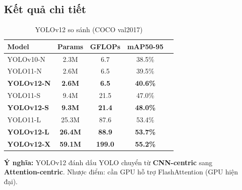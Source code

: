 \subsection{Kết quả chi tiết}
\begin{table}[H]\centering
\caption{YOLOv12 so sánh (COCO val2017)}
\begin{tabular}{lcccc}\toprule
\textbf{Model} & \textbf{Params} & \textbf{GFLOPs} & \textbf{mAP50-95}\\\midrule
YOLOv10-N & 2.3M & 6.7 & 38.5\% \\
YOLO11-N & 2.6M & 6.5 & 39.5\% \\
\textbf{YOLOv12-N} & \textbf{2.6M} & \textbf{6.5} & \textbf{40.6\%} \\
\midrule
YOLO11-S & 9.4M & 21.5 & 47.0\% \\
\textbf{YOLOv12-S} & \textbf{9.3M} & \textbf{21.4} & \textbf{48.0\%} \\
\midrule
YOLO11-L & 25.3M & 87.6 & 53.4\% \\
\textbf{YOLOv12-L} & \textbf{26.4M} & \textbf{88.9} & \textbf{53.7\%} \\
\midrule
\textbf{YOLOv12-X} & \textbf{59.1M} & \textbf{199.0} & \textbf{55.2\%} \\\bottomrule
\end{tabular}
\end{table}

\textbf{Ý nghĩa:} YOLOv12 đánh dấu YOLO chuyển từ \textbf{CNN-centric} sang \textbf{Attention-centric}. Nhược điểm: cần GPU hỗ trợ FlashAttention (GPU hiện đại).
